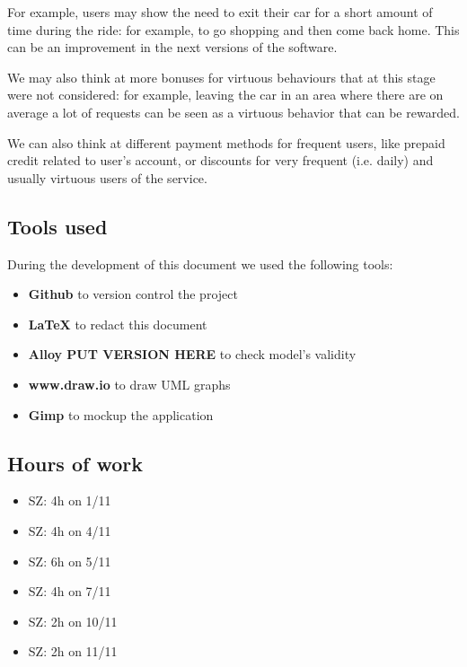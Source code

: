 \documentclass[11pt]{article} %
\begin{document}
For example, users may show the need to exit their car for a short amount of time during the ride: for example, to go shopping and then come back home. This can be an improvement in the next versions of the software.

We may also think at more bonuses for virtuous behaviours that at this stage were not considered: for example, leaving the car in an area where there are on average a lot of requests can be seen as a virtuous behavior that can be rewarded.

We can also think at different payment methods for frequent users, like prepaid credit related to user's account, or discounts for very frequent (i.e. daily) and usually virtuous users of the service.





\subsection{Tools used}
During the development of this document we used the following tools:
\begin{itemize}
	\item \textbf{Github} to version control the project
	\item \textbf{LaTeX} to redact this document
	\item \textbf{Alloy PUT VERSION HERE} to check model's validity
	\item \textbf{www.draw.io} to draw UML graphs
	\item \textbf{Gimp} to mockup the application
\end{itemize}

\subsection{Hours of work}

\begin{itemize}
	\item SZ: 4h on 1/11
	\item SZ: 4h on 4/11
	\item SZ: 6h on 5/11
	\item SZ: 4h on 7/11
	\item SZ: 2h on 10/11
	\item SZ: 2h on 11/11
\end{itemize}
\end{document}
